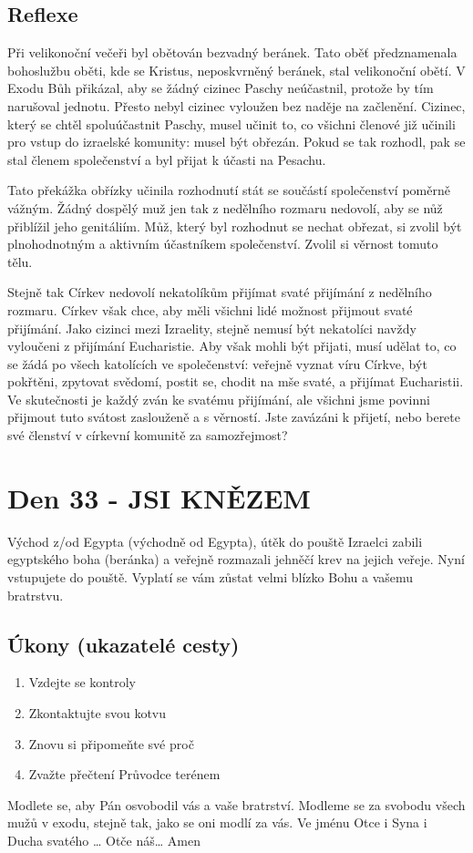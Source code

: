 \documentclass[11pt]{article}
\newcommand{\zacatekPatyTyden}{
  Východ z/od Egypta (východně od Egypta), útěk do pouště \newline
  Izraelci zabili egyptského boha (beránka) a veřejně rozmazali jehněčí krev na jejich veřeje. Nyní vstupujete
  do pouště. Vyplatí se vám zůstat velmi blízko Bohu a vašemu bratrstvu.

\subsection*{Úkony (ukazatelé cesty)}
\begin{enumerate}
  \item Vzdejte se kontroly
  \item Zkontaktujte svou kotvu
  \item Znovu si připomeňte své proč
  \item Zvažte přečtení Průvodce terénem
\end{enumerate}
Modlete se, aby Pán osvobodil vás a vaše bratrství. \newline
Modleme se za svobodu všech mužů v exodu, stejně tak, jako se oni modlí za vás.\newline
Ve jménu Otce i Syna i Ducha svatého …  Otče náš… Amen
}
\begin{document}
\subsection*{Reflexe}
Při velikonoční večeři byl obětován bezvadný beránek. Tato oběť předznamenala bohoslužbu oběti, kde se Kristus,
neposkvrněný beránek, stal velikonoční obětí. V Exodu Bůh přikázal, aby se žádný cizinec Paschy neúčastnil, protože
by tím narušoval jednotu. Přesto nebyl cizinec vyloužen bez naděje na začlenění. Cizinec, který se chtěl spoluúčastnit
Paschy, musel učinit to, co všichni členové již učinili pro vstup do izraelské komunity: musel být obřezán. Pokud se tak
rozhodl, pak se stal členem společenství a byl přijat k účasti na Pesachu.

Tato překážka obřízky učinila rozhodnutí stát se součástí společenství poměrně vážným. Žádný dospělý muž jen tak z
nedělního rozmaru nedovolí, aby se nůž přiblížil jeho genitáliím. Můž, který byl rozhodnut se nechat obřezat, si zvolil
být plnohodnotným a aktivním účastníkem společenství. Zvolil si věrnost tomuto tělu.

Stejně tak Církev nedovolí nekatolíkům přijímat svaté přijímání z nedělního rozmaru. Církev však chce, aby měli
všichni lidé možnost přijmout svaté přijímání. Jako cizinci mezi Izraelity, stejně nemusí být nekatolíci navždy
vyloučeni z přijímání Eucharistie. Aby však mohli být přijati, musí udělat to, co se žádá po všech katolících ve
společenství: veřejně vyznat víru Církve, být pokřtěni, zpytovat svědomí, postit se, chodit na mše svaté, a přijímat
Eucharistii. Ve skutečnosti je každý zván ke svatému přijímání, ale všichni jsme povinni přijmout tuto svátost
zaslouženě a s věrností. Jste zavázáni k přijetí, nebo berete své členství v církevní komunitě za samozřejmost?

\newpage
\section{Den 33 - JSI KNĚZEM}
\zacatekPatyTyden
\end{document}
